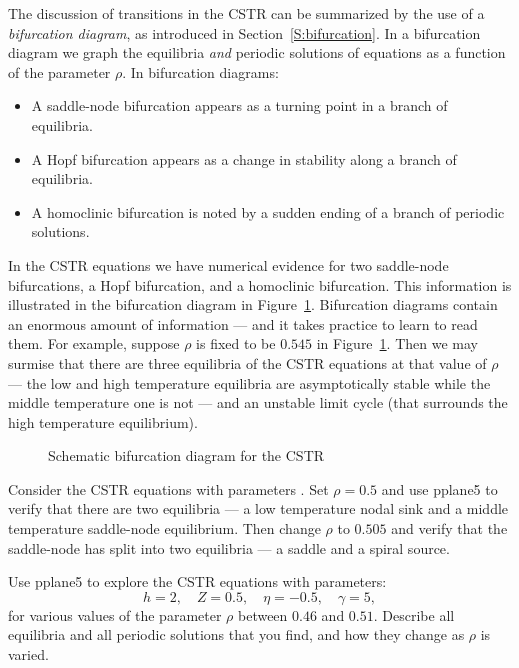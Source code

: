 \documentclass{ximera}
\begin{document}
The discussion of transitions in the 
CSTR can be summarized by the use of a 
{\em bifurcation diagram\/}, as introduced in Section~\ref{S:bifurcation}.  
In a bifurcation diagram we graph the equilibria {\em and\/} periodic 
solutions of equations as a function of the parameter $\rho$.  In 
bifurcation diagrams: 
\begin{itemize}
\item	A saddle-node bifurcation appears as a turning point in 
	a branch of equilibria.
\item	A Hopf bifurcation appears as a change in stability along 
	a branch of equilibria.
\item	A homoclinic bifurcation is noted by a sudden ending of a 
	branch of periodic solutions.
\end{itemize}
In the CSTR equations we have numerical evidence for two saddle-node 
bifurcations, a Hopf bifurcation, and a homoclinic bifurcation.  
This information is illustrated in the bifurcation diagram in 
Figure~\ref{F:CSTRbif}.  Bifurcation diagrams contain an enormous amount 
of information --- and it takes practice to learn to read them.  For 
example, suppose $\rho$ is fixed to be $0.545$ in Figure~\ref{F:CSTRbif}.
Then we may surmise that there are three equilibria of the CSTR equations
at that value of $\rho$ --- the low and high temperature equilibria are 
asymptotically stable while the middle temperature one is not --- and an 
unstable limit cycle (that surrounds the high temperature equilibrium).

\begin{figure}[htb]
           \centerline{%
	   }
           \caption{Schematic bifurcation diagram for the CSTR}
           \label{F:CSTRbif}
\end{figure}


\EXER

\CEXER

\begin{exercise}  \label{E:CSTR5}
Consider the CSTR equations  with parameters 
. Set $\rho=0.5$ and use 
{\sf pplane5} to verify 
that there are two equilibria --- a low temperature nodal sink 
and a middle temperature saddle-node equilibrium.  Then change 
$\rho$ to $0.505$ and verify that the saddle-node has split 
into two equilibria --- a saddle and a spiral source.
\end{exercise}

\begin{exercise} \label{c9.2.2}
Use {\sf pplane5} to explore the CSTR equations  with
parameters:
\[
h=2, \quad Z=0.5, \quad \eta=-0.5, \quad \gamma=5,
\]
for various values of the parameter $\rho$ between $0.46$ and 
$0.51$.  Describe all equilibria and all periodic solutions that 
you find, and how they change as $\rho$ is varied.
\end{exercise}
\end{document}
